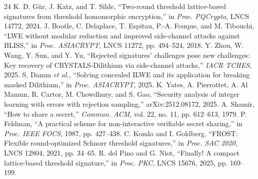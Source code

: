 \documentclass[10pt,conference,a4paper]{IEEEtran}
\begin{document}
\begin{thebibliography}{24}
 K. D. G\"ur, J. Katz, and T. Silde, ``Two-round threshold lattice-based signatures from threshold homomorphic encryption,'' in \emph{Proc. PQCrypto}, LNCS 14772, 2024.
 J. Bootle, C. Delaplace, T. Espitau, P.-A. Fouque, and M. Tibouchi, ``LWE without modular reduction and improved side-channel attacks against BLISS,'' in \emph{Proc. ASIACRYPT}, LNCS 11272, pp. 494--524, 2018.
 Y. Zhou, W. Wang, Y. Sun, and Y. Yu, ``Rejected signatures' challenges pose new challenges: Key recovery of CRYSTALS-Dilithium via side-channel attacks,'' \emph{IACR TCHES}, 2025.
 S. Damm \emph{et al.}, ``Solving concealed ILWE and its application for breaking masked Dilithium,'' in \emph{Proc. ASIACRYPT}, 2025.
 K. Yates, A. Pierrottet, A. Al Mamun, R. Cartor, M. Chowdhury, and S. Gao, ``Security analysis of integer learning with errors with rejection sampling,'' arXiv:2512.08172, 2025.
 A. Shamir, ``How to share a secret,'' \emph{Commun. ACM}, vol. 22, no. 11, pp. 612--613, 1979.
 P. Feldman, ``A practical scheme for non-interactive verifiable secret sharing,'' in \emph{Proc. IEEE FOCS}, 1987, pp. 427--438.
 C. Komlo and I. Goldberg, ``FROST: Flexible round-optimized Schnorr threshold signatures,'' in \emph{Proc. SAC 2020}, LNCS 12804, 2021, pp. 34--65.
 R. del Pino and G. Niot, ``Finally! A compact lattice-based threshold signature,'' in \emph{Proc. PKC}, LNCS 15676, 2025, pp. 169--199.
\end{thebibliography}
\end{document}
